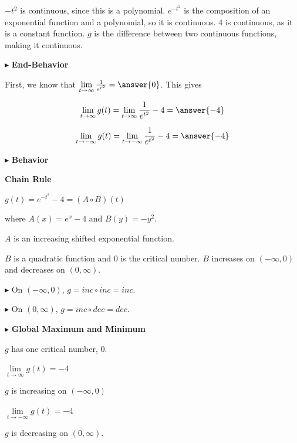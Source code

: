 \documentclass{ximera}
\begin{document}
$-t^2$ is continuous, since this is a polynomial.  $e^{-t^2}$ is the composition of an exponential function and a polynomial, so it is continuous. $4$ is continuous, as it is a constant function. $g$ is the difference between two continuous functions, making it continuous.






$\blacktriangleright$  \textbf{\textcolor{blue!55!black}{End-Behavior}} 



First, we know that $\lim\limits_{t \to \infty}  \frac{1}{e^{t^2}} = \answer{0}$.  This gives


\[   \lim\limits_{t \to \infty} g(t) =  \lim\limits_{t \to \infty}  \frac{1}{e^{t^2}} - 4 = \answer{-4} \]


\[   \lim\limits_{t \to -\infty} g(t) =  \lim\limits_{t \to -\infty}  \frac{1}{e^{t^2}} - 4 = \answer{-4} \]





$\blacktriangleright$  \textbf{\textcolor{blue!55!black}{Behavior}} 



\textbf{Chain Rule}



$g(t) = e^{-t^2} - 4 = (A \circ B)(t)$

where $A(x) = e^x - 4$ and $B(y) = -y^2$.

$A$ is an increasing shifted exponential function.

$B$ is a quadratic function and $0$ is the critical number.  $B$ increases on $(-\infty, 0)$ and decreases on $(0, \infty)$.


$\blacktriangleright$ On $(-\infty, 0)$, $g = inc \circ inc = inc$.

$\blacktriangleright$ On $(0, \infty)$, $g = inc \circ dec = dec$.







$\blacktriangleright$  \textbf{\textcolor{blue!55!black}{Global Maximum and Minimum}} 


$g$ has one critical number, $0$.


$\lim\limits_{t \to \infty} g(t) =  -4$

$g$ is increasing on $(-\infty, 0)$

$\lim\limits_{t \to -\infty} g(t) =  -4$

$g$ is decreasing on $(0, \infty)$.
\end{document}
